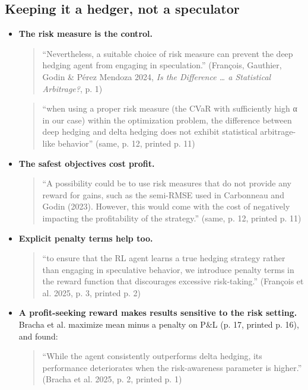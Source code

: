 \documentclass{article}
\begin{document}
\subsection{Keeping it a hedger, not a speculator}

\begin{itemize}

\item \textbf{The risk measure is the control.}

\begin{quote}``Nevertheless, a suitable choice of risk measure can prevent the deep hedging agent from engaging in speculation.'' (François, Gauthier, Godin \& Pérez Mendoza 2024, \emph{Is the Difference \ldots{} a Statistical Arbitrage?}, p. 1)\end{quote}

\begin{quote}``when using a proper risk measure (the CVaR with sufficiently high α in our case) within the optimization problem, the difference between deep hedging and delta hedging does not exhibit statistical arbitrage-like behavior'' (same, p. 12, printed p. 11)\end{quote}

\item \textbf{The safest objectives cost profit.}

\begin{quote}``A possibility could be to use risk measures that do not provide any reward for gains, such as the semi-RMSE used in Carbonneau and Godin (2023). However, this would come with the cost of negatively impacting the profitability of the strategy.'' (same, p. 12, printed p. 11)\end{quote}

\item \textbf{Explicit penalty terms help too.}

\begin{quote}``to ensure that the RL agent learns a true hedging strategy rather than engaging in speculative behavior, we introduce penalty terms in the reward function that discourages excessive risk-taking.'' (François et al. 2025, p. 3, printed p. 2)\end{quote}

\item \textbf{A profit-seeking reward makes results sensitive to the risk setting.} Bracha et al. maximize mean minus a penalty on P\&L (p. 17, printed p. 16), and found:

\begin{quote}``While the agent consistently outperforms delta hedging, its performance deteriorates when the risk-awareness parameter is higher.'' (Bracha et al. 2025, p. 2, printed p. 1)\end{quote}

\end{itemize}
\end{document}
